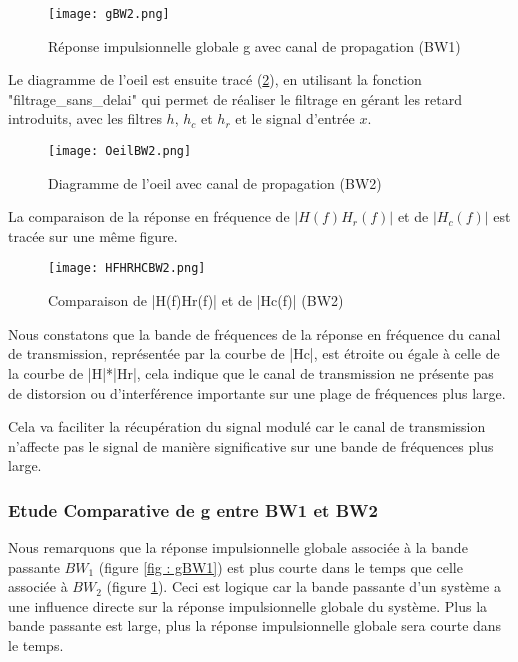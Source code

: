 \documentclass[11pt]{article}
\begin{document}
\begin{figure}[ht!]
            \centering
            \texttt{[image: gBW2.png]}
            \caption{Réponse impulsionnelle globale g avec canal de propagation (BW1)\label{fig : gBW2}}
\end{figure}

Le diagramme de l'oeil est ensuite tracé (\ref{fig : OeilBW2}), en utilisant la fonction "filtrage\_sans\_delai" qui permet de réaliser le filtrage en gérant les retard introduits, avec les filtres $h$, $h_c$ et $h_r$ et le signal d'entrée $x$.

\begin{figure}[ht!]
            \centering
            \texttt{[image: OeilBW2.png]}
            \caption{Diagramme de l'oeil avec canal de propagation (BW2)\label{fig : OeilBW2}}
\end{figure}

La comparaison de la réponse en fréquence de $|H(f)H_r(f)|$ et de $|H_c(f)|$ est tracée sur une même figure.

\begin{figure}[ht!]
            \centering
            \texttt{[image: HFHRHCBW2.png]}
            \caption{Comparaison de |H(f)Hr(f)| et de |Hc(f)| (BW2)\label{fig : HFHRHCBW2}}
\end{figure}

Nous constatons que la bande de fréquences de la réponse en fréquence du canal de transmission, représentée par la courbe de |Hc|, est étroite ou égale à celle de la courbe de |H|*|Hr|, cela indique que le canal de transmission ne présente pas de distorsion ou d'interférence importante sur une plage de fréquences plus large.

Cela va faciliter la récupération du signal modulé car le canal de transmission n'affecte pas le signal de manière significative sur une bande de fréquences plus large.

\subsubsection{Etude Comparative de g entre BW1 et BW2}
Nous remarquons que la réponse impulsionnelle globale associée à la bande passante $BW_1$ (figure \ref{fig : gBW1}) est plus courte dans le temps que celle associée à $BW_2$ (figure \ref{fig : gBW2}). Ceci est logique car la bande passante d'un système a une influence directe sur la réponse impulsionnelle globale du système. Plus la bande passante est large, plus la réponse impulsionnelle globale sera courte dans le temps.
\end{document}

